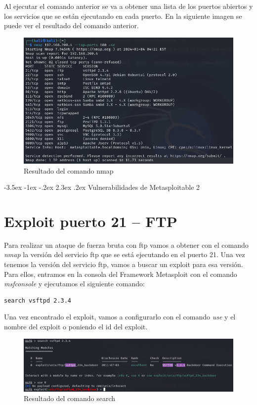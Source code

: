 \documentclass[11pt]{report}
\makeatletter
\renewcommand\chapter{\@startsection{chapter}{0}{\z@}%
    {-3.5ex \@plus -1ex \@minus -.2ex}%
    {2.3ex \@plus.2ex}%
    {\normalfont\Large\bfseries}}
\makeatother
\begin{document}
Al ejecutar el comando anterior se va a obtener una lista de los puertos abiertos y los servicios que se están ejecutando en cada puerto. En la siguiente imagen se puede ver el resultado del comando anterior.
\begin{figure}[H]
  \centering
  \includegraphics[scale=0.55]{img/nmap.png}
  \caption{Resultado del comando nmap}
  \label{fig:Resultado del comando nmap}
\end{figure}

\chapter{Vulnerabilidades de Metasploitable 2}

\section{Exploit puerto 21 – FTP}
Para realizar un ataque de fuerza bruta con ftp vamos a obtener con el comando \emph{nmap} la versión del servicio ftp que se está ejecutando en el puerto 21.
Una vez tenemos la versión del servicio ftp, vamos a buscar un exploit para esa versión. Para ellos, entramos en la consola del Framework Metasploit con el comando \emph{msfconsole} y ejecutamos el siguiente comando:
\begin{BVerbatim}
search vsftpd 2.3.4
\end{BVerbatim}

Una vez encontrado el exploit, vamos a configurarlo con el comando \emph{use} y el nombre del exploit o poniendo el id del exploit.
\begin{figure}[H]
  \centering
  \includegraphics[scale=0.5]{img/search_vsftpd.png}
  \caption{Resultado del comando search}
\end{figure}
\end{document}
